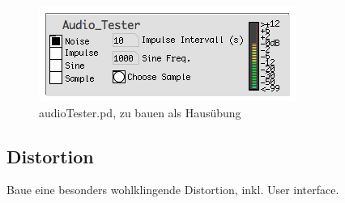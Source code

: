\begin{figure}[H]
	\begin{center}
		\includegraphics[scale = 1]{img/audioTester.png}
		\caption{audioTester.pd, zu bauen als Hausübung}
		\label{fig:audiotester}
	\end{center}
\end{figure}

\subsection{Distortion}
Baue eine besonders wohlklingende Distortion, inkl. User interface.

